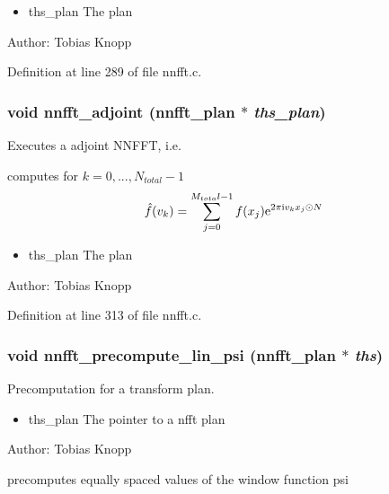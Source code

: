 \begin{itemize}
\item ths\_\-plan The plan\end{itemize}
\begin{Desc}
\item[Author:]Tobias Knopp \end{Desc}


Definition at line 289 of file nnfft.c.\hypertarget{group__nnfft_gd4f536f3aee7e85acc75c5fcad307b7d}{
\subsubsection{\setlength{\rightskip}{0pt plus 5cm}void nnfft\_\-adjoint ({\bf nnfft\_\-plan} $\ast$ {\em ths\_\-plan})}}
\label{group__nnfft_gd4f536f3aee7e85acc75c5fcad307b7d}


Executes a adjoint NNFFT, i.e. 

computes for $k=0,...,N_{total}-1$ \[ \hat{f}(v_k) = \sum_{j = 0}^{M_{tota}l-1} f(x_j) {\rm e}^{2 \pi \mbox{\rm\scriptsize i} v_k x_j \odot N} \]

\begin{itemize}
\item ths\_\-plan The plan\end{itemize}
\begin{Desc}
\item[Author:]Tobias Knopp \end{Desc}


Definition at line 313 of file nnfft.c.\hypertarget{group__nnfft_g65983eef73b9f5740214bf720f62fcd6}{
\subsubsection{\setlength{\rightskip}{0pt plus 5cm}void nnfft\_\-precompute\_\-lin\_\-psi ({\bf nnfft\_\-plan} $\ast$ {\em ths})}}
\label{group__nnfft_g65983eef73b9f5740214bf720f62fcd6}


Precomputation for a transform plan. 

\begin{itemize}
\item ths\_\-plan The pointer to a nfft plan\end{itemize}
\begin{Desc}
\item[Author:]Tobias Knopp\end{Desc}
precomputes equally spaced values of the window function psi

